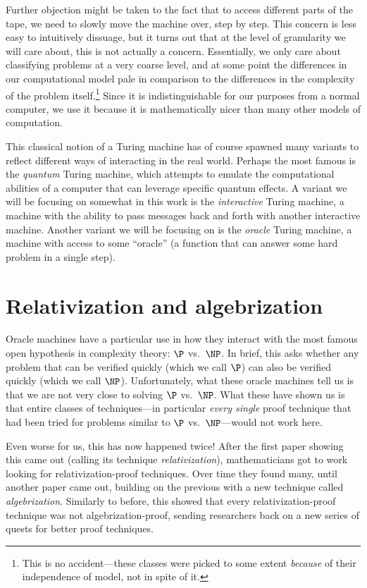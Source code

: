 \documentclass[english,12pt]{reedthesis}
\theoremstyle{plain}
\theoremstyle{definition}
\theoremstyle{remark}
\begin{document}
Further objection might be taken to the fact that to access different parts of
the tape, we need to slowly move the machine over, step by step. This concern is
less easy to intuitively dissuage, but it turns out that at the level of
granularity we will care about, this is not actually a concern. Essentially, we
only care about classifying problems at a very coarse level, and at some point
the differences in our computational model pale in comparison to the differences
in the complexity of the problem itself.\footnote{This is no accident---these
  classes were picked to some extent \emph{because} of their independence of
  model, not in spite of it.} Since it is indistinguishable for our purposes
from a normal computer, we use it because it is mathematically nicer than many
other models of computation.

This classical notion of a Turing machine has of course spawned many variants to
reflect different ways of interacting in the real world. Perhaps the most famous
is the \emph{quantum} Turing machine, which attempts to emulate the
computational abilities of a computer that can leverage specific quantum
effects. A variant we will be focusing on somewhat in this work is the
\emph{interactive} Turing machine, a machine with the ability to pass messages
back and forth with another interactive machine. Another variant we will be
focusing on is the \emph{oracle} Turing machine, a machine with access to some
``oracle'' (a function that can answer some hard problem in a single step).

\section{Relativization and algebrization}

Oracle machines have a particular use in how they interact with the most famous
open hypothesis in complexity theory: $\P$ vs.\ $\NP$. In brief, this asks
whether any problem that can be verified quickly (which we call $\P$) can also
be verified quickly (which we call $\NP$). Unfortunately, what these oracle
machines tell us is that we are not very close to solving $\P$ vs.\ $\NP$. What
these have shown us is that entire classes of techniques---in particular
\emph{every single} proof technique that had been tried for problems similar to
$\P$ vs.\ $\NP$---would not work here.

Even worse for us, this has now happened twice! After the first paper showing
this came out (calling its technique \emph{relativization}), mathematicians got
to work looking for relativization-proof techniques. Over time they found many,
until another paper came out, building on the previous with a new technique
called \emph{algebrization}. Similarly to before, this showed that every
relativization-proof technique was not algebrization-proof, sending researchers
back on a new series of quests for better proof techniques.
\end{document}
